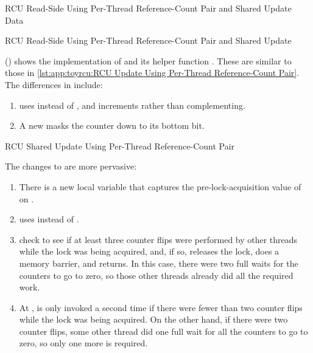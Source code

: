 \begin{listing}

\caption{RCU Read-Side Using Per-Thread Reference-Count Pair and Shared Update Data}
\label{lst:app:toyrcu:RCU Read-Side Using Per-Thread Reference-Count Pair and Shared Update Data}
\end{listing}

\begin{listing}

\caption{RCU Read-Side Using Per-Thread Reference-Count Pair and Shared Update}
\label{lst:app:toyrcu:RCU Read-Side Using Per-Thread Reference-Count Pair and Shared Update}
\end{listing}

()
shows the implementation of  and its helper
function .
These are similar to those in
\cref{lst:app:toyrcu:RCU Update Using Per-Thread Reference-Count Pair}.
The differences in  include:
\begin{fcvref}
\begin{enumerate}
\item	{} uses  instead of ,
	and increments rather than complementing.
\item	A new  masks the counter down to its bottom bit.
\end{enumerate}
\end{fcvref}

\begin{listing}

\caption{RCU Shared Update Using Per-Thread Reference-Count Pair}
\label{lst:app:toyrcu:RCU Shared Update Using Per-Thread Reference-Count Pair}
\end{listing}

\begin{fcvref}
The changes to  are more pervasive:
\begin{enumerate}
\item	There is a new  local variable that captures
	the pre-lock-acquisition value of  on
	.
\item	{} uses  instead of .
\item	{} check to see if at least three counter flips were
	performed by other threads while the lock was being acquired,
	and, if so, releases the lock, does a memory barrier, and returns.
	In this case, there were two full waits for the counters to
	go to zero, so those other threads already did all the required work.
\item	At ,  is only
	invoked a second time if there were fewer than two counter flips
	while the lock was being acquired.
	On the other hand, if there were two counter flips, some other
	thread did one full wait for all the counters to go to zero,
	so only one more is required.
\end{enumerate}
\end{fcvref}

